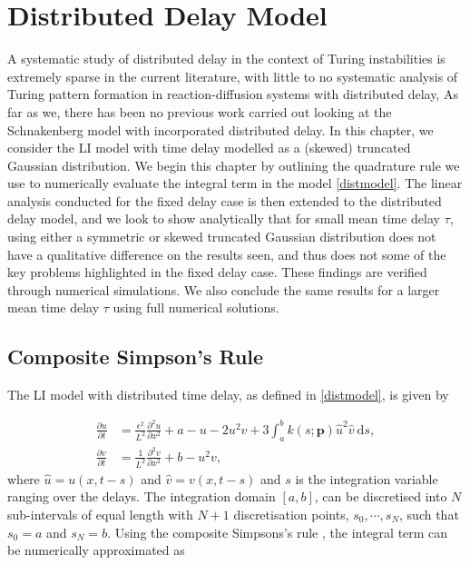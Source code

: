 \chapter{Distributed Delay Model}\label{section:distdel}
A systematic study of distributed delay in the context of Turing instabilities is extremely sparse in the current literature, with little to no systematic analysis of Turing pattern formation in reaction-diffusion systems with distributed delay,  As far as we, there has been no previous work carried out looking at the Schnakenberg model with incorporated distributed delay. In this chapter, we consider the LI model with time delay modelled as a (skewed) truncated Gaussian distribution. We begin this chapter by outlining the quadrature rule we use to numerically evaluate the integral term in the model \eqref{distmodel}. The linear analysis conducted for the fixed delay case is then extended to the distributed delay model, and we look to show analytically that for small mean time delay $\tau$, using either a symmetric or skewed truncated Gaussian distribution does not have a qualitative difference on the results seen, and thus does not  some of the key problems highlighted in the fixed delay case. These findings are verified through numerical simulations. We also conclude the same results for a larger mean time delay $\tau$ using full numerical solutions.
\section{Composite Simpson's Rule}\label{section:quad}

The LI model with distributed time delay, as defined in \eqref{distmodel}, is given by

\begin{equation}\label{distmodel2}
  \begin{split}
    \frac{\partial u}{\partial t}&=\frac{\epsilon^2}{L^2}\frac{\partial^2u}{\partial x^2}+a-u-2u^2v+3\int_{a}^{b}k(s;\textbf{p})\hat{u}^2\hat{v} \ \text{d}s,\\
    \frac{\partial v}{\partial t}&=\frac{1}{L^2}\frac{\partial^2v}{\partial x^2}+b-u^2v,
\end{split}
\end{equation}
where $\hat{u}=u(x,t-s)$ and $\hat{v}=v(x,t-s)$ and $s$ is the integration variable ranging over the delays. The integration domain $[a, b]$, can be discretised into $N$ sub-intervals of equal length with $N+1$ discretisation points, $s_0,\cdots,s_{N}$, such that $s_0=a$ and $s_N=b$. Using the composite Simpsons's rule \cite{compsimp}, the integral term can be numerically approximated as

